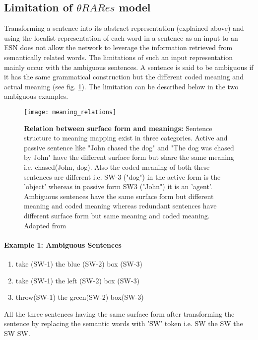 \subsection{Limitation of $\theta RARes$ model }

Transforming a sentence into its abstract representation (explained above) and using the localist representation of each word in a sentence as an input to an ESN does not allow the network to leverage the information retrieved from semantically related words. The limitations of such an input representation mainly occur with the ambiguous sentences. A sentence is said to be ambiguous if it has the same grammatical construction but the different coded meaning and actual meaning (see fig. \ref{fig:meaning_realtions}). The limitation can be described below in the two ambiguous examples.

\begin{figure}[hbtp]
\centering
\texttt{[image: meaning\_relations]}
\caption[Different type of sentence structure to meaning relations] {\textbf{Relation between surface form and meanings:} Sentence structure to meaning mapping exist in three categories. Active and passive sentence like "John chased the dog" and "The dog was chased by John" have the different surface form but share the same meaning i.e. chased(John, dog). Also the coded meaning of both these sentences are different i.e. SW-3 ("dog") in the active form is the 'object' whereas in passive form SW3 ("John") it is an 'agent'. Ambiguous sentences have the same surface form but different meaning and coded meaning whereas redundant sentences have different surface form but same meaning and coded meaning. Adapted from \cite{end-to-end}}
\label{fig:meaning_realtions}
\end{figure}

\paragraph{Example 1: Ambiguous Sentences}

\begin{enumerate}[noitemsep]
\item take (SW-1) the blue (SW-2) box (SW-3) \label{eg-1:sent-1}
\item take (SW-1) the left (SW-2) box (SW-3) \label{eg-1:sent-2}
\item throw(SW-1) the green(SW-2) box(SW-3)  \label{eg-1:sent-3} 
\end{enumerate}

All the three sentences having the same surface form after transforming the sentence by replacing the semantic words with 'SW' token i.e. SW the SW the SW SW.

